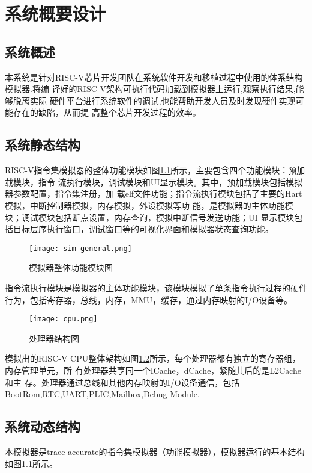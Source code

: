 
\chapter{系统概要设计}

\section{系统概述}
本系统是针对RISC-V芯片开发团队在系统软件开发和移植过程中使用的体系结构模拟器.将编
译好的RISC-V架构可执行代码加载到模拟器上运行,观察执行结果,能够脱离实际
硬件平台进行系统软件的调试,也能帮助开发人员及时发现硬件实现可能存在的缺陷，从而提
高整个芯片开发过程的效率。

\section{系统静态结构}
RISC-V指令集模拟器的整体功能模块如图\ref{fig:sim_general}所示，主要包含四个功能模块：预加载模块，指令
流执行模块，调试模块和UI显示模块。其中，预加载模块包括模拟器参数配置，指令集注册，加
载elf文件功能；指令流执行模块包括了主要的Hart模拟，中断控制器模拟，内存模拟，外设模拟等功
能，是模拟器的主体功能模块；调试模块包括断点设置，内存查询，模拟中断信号发送功能；UI
显示模块包括目标层序执行窗口，调试窗口等的可视化界面和模拟器状态查询功能。
\begin{figure}[h]
  \centering
  \texttt{[image: sim-general.png]}
  \caption{模拟器整体功能模块图}
  \label{fig:sim_general}
\end{figure}


指令流执行模块是模拟器的主体功能模块，该模块模拟了单条指令执行过程的硬件行为，包括寄存器，总线，内存，MMU，缓存，通过内存映射的I/O设备等。
\begin{figure}[h]
  \centering
  \texttt{[image: cpu.png]}
  \caption{处理器结构图}
  \label{fig:cpu}
\end{figure}

模拟出的RISC-V CPU整体架构如图\ref{fig:cpu}所示，每个处理器都有独立的寄存器组，内存管理单元，所
有处理器共享同一个ICache，dCache，紧随其后的是L2Cache和主
存。处理器通过总线和其他内存映射的I/O设备通信，包括BootRom,RTC,UART,PLIC,Mailbox,Debug Module.


\section{系统动态结构}
本模拟器是trace-accurate的指令集模拟器（功能模拟器），模拟器运行的基本结构如图1.1所示。


